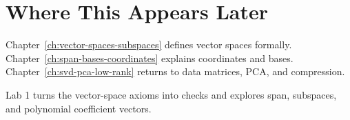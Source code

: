 \section*{Where This Appears Later}

Chapter~\ref{ch:vector-spaces-subspaces} defines vector spaces formally.
Chapter~\ref{ch:span-bases-coordinates} explains coordinates and bases.
Chapter~\ref{ch:svd-pca-low-rank} returns to data matrices, PCA, and compression.

\begin{labbox}
Lab 1 turns the vector-space axioms into \Python checks and explores span,
subspaces, and polynomial coefficient vectors.
\end{labbox}


